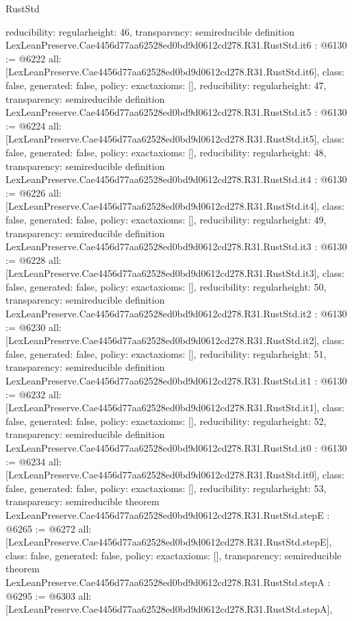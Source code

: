 \begin{lexlean}{RustStd}
\begin{coremodule}
{  reducibility: regular{height: 46},
  transparency: semireducible
}
definition LexLeanPreserve.Cae4456d77aa62528ed0bd9d0612cd278.R31.RustStd.it6 : @6130 := @6222 {
  all: [LexLeanPreserve.Cae4456d77aa62528ed0bd9d0612cd278.R31.RustStd.it6],
  class: false,
  generated: false,
  policy: exact{axioms: []},
  reducibility: regular{height: 47},
  transparency: semireducible
}
definition LexLeanPreserve.Cae4456d77aa62528ed0bd9d0612cd278.R31.RustStd.it5 : @6130 := @6224 {
  all: [LexLeanPreserve.Cae4456d77aa62528ed0bd9d0612cd278.R31.RustStd.it5],
  class: false,
  generated: false,
  policy: exact{axioms: []},
  reducibility: regular{height: 48},
  transparency: semireducible
}
definition LexLeanPreserve.Cae4456d77aa62528ed0bd9d0612cd278.R31.RustStd.it4 : @6130 := @6226 {
  all: [LexLeanPreserve.Cae4456d77aa62528ed0bd9d0612cd278.R31.RustStd.it4],
  class: false,
  generated: false,
  policy: exact{axioms: []},
  reducibility: regular{height: 49},
  transparency: semireducible
}
definition LexLeanPreserve.Cae4456d77aa62528ed0bd9d0612cd278.R31.RustStd.it3 : @6130 := @6228 {
  all: [LexLeanPreserve.Cae4456d77aa62528ed0bd9d0612cd278.R31.RustStd.it3],
  class: false,
  generated: false,
  policy: exact{axioms: []},
  reducibility: regular{height: 50},
  transparency: semireducible
}
definition LexLeanPreserve.Cae4456d77aa62528ed0bd9d0612cd278.R31.RustStd.it2 : @6130 := @6230 {
  all: [LexLeanPreserve.Cae4456d77aa62528ed0bd9d0612cd278.R31.RustStd.it2],
  class: false,
  generated: false,
  policy: exact{axioms: []},
  reducibility: regular{height: 51},
  transparency: semireducible
}
definition LexLeanPreserve.Cae4456d77aa62528ed0bd9d0612cd278.R31.RustStd.it1 : @6130 := @6232 {
  all: [LexLeanPreserve.Cae4456d77aa62528ed0bd9d0612cd278.R31.RustStd.it1],
  class: false,
  generated: false,
  policy: exact{axioms: []},
  reducibility: regular{height: 52},
  transparency: semireducible
}
definition LexLeanPreserve.Cae4456d77aa62528ed0bd9d0612cd278.R31.RustStd.it0 : @6130 := @6234 {
  all: [LexLeanPreserve.Cae4456d77aa62528ed0bd9d0612cd278.R31.RustStd.it0],
  class: false,
  generated: false,
  policy: exact{axioms: []},
  reducibility: regular{height: 53},
  transparency: semireducible
}
theorem LexLeanPreserve.Cae4456d77aa62528ed0bd9d0612cd278.R31.RustStd.stepE : @6265 := @6272 {
  all: [LexLeanPreserve.Cae4456d77aa62528ed0bd9d0612cd278.R31.RustStd.stepE],
  class: false,
  generated: false,
  policy: exact{axioms: []},
  transparency: semireducible
}
theorem LexLeanPreserve.Cae4456d77aa62528ed0bd9d0612cd278.R31.RustStd.stepA : @6295 := @6303 {
  all: [LexLeanPreserve.Cae4456d77aa62528ed0bd9d0612cd278.R31.RustStd.stepA],
}
\end{coremodule}
\end{lexlean}
